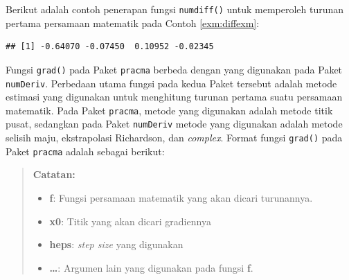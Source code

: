 \documentclass[
]{book}
\newenvironment{Shaded}{\begin{snugshade}}{\end{snugshade}}
\newcommand{\AttributeTok}[1]{\textcolor[rgb]{0.13,0.29,0.53}{#1}}
\newcommand{\ControlFlowTok}[1]{\textcolor[rgb]{0.13,0.29,0.53}{\textbf{#1}}}
\newcommand{\DecValTok}[1]{\textcolor[rgb]{0.00,0.00,0.81}{#1}}
\newcommand{\FunctionTok}[1]{\textcolor[rgb]{0.13,0.29,0.53}{\textbf{#1}}}
\newcommand{\NormalTok}[1]{#1}
\newcommand{\SpecialCharTok}[1]{\textcolor[rgb]{0.81,0.36,0.00}{\textbf{#1}}}
\providecommand{\tightlist}{%
  \setlength{\itemsep}{0pt}\setlength{\parskip}{0pt}}
\theoremstyle{definition}
\theoremstyle{definition}
\theoremstyle{definition}
\theoremstyle{definition}
\theoremstyle{remark}
\begin{document}
Berikut adalah contoh penerapan fungsi \texttt{numdiff()} untuk memperoleh turunan pertama persamaan matematik pada Contoh \ref{exm:diffexm}:

\begin{Shaded}
\end{Shaded}

\begin{verbatim}
## [1] -0.64070 -0.07450  0.10952 -0.02345
\end{verbatim}

Fungsi \texttt{grad()} pada Paket \texttt{pracma} berbeda dengan yang digunakan pada Paket \texttt{numDeriv}. Perbedaan utama fungsi pada kedua Paket tersebut adalah metode estimasi yang digunakan untuk menghitung turunan pertama suatu persamaan matematik. Pada Paket \texttt{pracma}, metode yang digunakan adalah metode titik pusat, sedangkan pada Paket \texttt{numDeriv} metode yang digunakan adalah metode selisih maju, ekstrapolasi Richardson, dan \emph{complex}. Format fungsi \texttt{grad()} pada Paket \texttt{pracma} adalah sebagai berikut:

\begin{Shaded}
\end{Shaded}

\begin{quote}
\textbf{Catatan:}

\begin{itemize}
\tightlist
\item
  \textbf{f}: Fungsi persamaan matematik yang akan dicari turunannya.
\item
  \textbf{x0}: Titik yang akan dicari gradiennya
\item
  \textbf{heps}: \emph{step size} yang digunakan
\item
  \textbf{\ldots{}}: Argumen lain yang digunakan pada fungsi \textbf{f}.
\end{itemize}
\end{quote}
\end{document}
